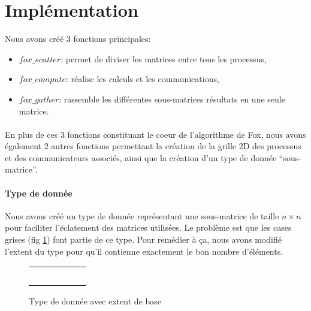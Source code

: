 \documentclass[12pt]{article}
\begin{document}
\section{Implémentation} \label{s:impl}
Nous avons créé 3 fonctions principales:
\begin{itemize}
\item $fox\_scatter$: permet de diviser les matrices entre tous les processus,
\item $fox\_compute$: réalise les calculs et les communications,
\item $fox\_gather$: rassemble les différentes sous-matrices résultats en une seule matrice.
\end{itemize}

\paragraph{}
En plus de ces 3 fonctions constituant le coeur de l'algorithme de Fox, nous avons également 2 autres fonctions permettant la création de la grille 2D des processus et des communicateurs associés, ainsi que la création d'un type de donnée ``sous-matrice''.

\paragraph{Type de donnée}
Nous avons créé un type de donnée représentant une sous-matrice de taille $n\times n$ pour faciliter l'éclatement des matrices utilisées. Le problème est que les cases grises (fig \ref{fig:datatype}) font partie de ce type. Pour remédier à ça, nous avons modifié l'extent du type pour qu'il contienne exactement le bon nombre d'éléments. 


\begin{figure}[ht]
  \centering
  \begin{tabular}{|c|c|c||c|c|c|}
    \hline
    \cellcolor{green}& \cellcolor{green} & \cellcolor{green} & & & \\ 
    \hline
    \cellcolor{green}& \cellcolor{green} & \cellcolor{green} & & & \\
    \hline
    \cellcolor{green}& \cellcolor{green} & \cellcolor{green} & & & \\ 
    \hline
    \hline
    \cellcolor{gray}& \cellcolor{gray} & & & & \\ 
    \hline
    \cellcolor{gray}& \cellcolor{gray} & & & & \\
    \hline
    \cellcolor{gray}& \cellcolor{gray} & & & & \\ 
    \hline
  \end{tabular}
  \caption{\label{fig:datatype} Type de donnée avec extent de base}
\end{figure}
\end{document}

